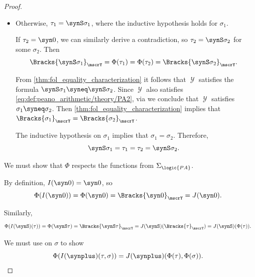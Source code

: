 \begin{proof}
\begin{itemize}
     implies that \( \mscrY \) satisfies \( \syn0 \syneq \synS \sigma_2 \), which contradicts the assumption that \( \mscrY \) satisfies \eqref{eq:def:peano_arithmetic/theory/PA1}.

    \item Otherwise, \( \tau_1 = \synS \sigma_1 \), where the inductive hypothesis holds for \( \sigma_1 \).

    If \( \tau_2 = \syn0 \), we can similarly derive a contradiction, so \( \tau_2 = \synS \sigma_2 \) for some \( \sigma_2 \). Then
    \begin{equation*}
      \Bracks{\synS \sigma_1}_\mscrY = \Phi(\tau_1) = \Phi(\tau_2) = \Bracks{\synS \sigma_2}_\mscrY.
    \end{equation*}

    From \cref{thm:fol_equality_characterization} it follows that \( \mscrY \) satisfies the formula \( \synS \sigma_1 \syneq \synS \sigma_2 \). Since \( \mscrY \) also satisfies \eqref{eq:def:peano_arithmetic/theory/PA2}, via  we conclude that \( \mscrY \) satisfies \( \sigma_1 \syneq \sigma_2 \). Then \cref{thm:fol_equality_characterization} implies that \( \Bracks{\sigma_1}_\mscrY = \Bracks{\sigma_2}_\mscrY \).

    The inductive hypothesis on \( \sigma_1 \) implies that \( \sigma_1 = \sigma_2 \). Therefore,
    \begin{equation*}
      \synS \sigma_1 = \tau_1 = \tau_2 = \synS \sigma_2.
    \end{equation*}
  \end{itemize}

   We must show that \( \Phi \) respects the functions from \( \Sigma_{\logic{PA}} \).

   By definition, \( I(\syn0) = \syn0 \), so
  \begin{equation*}
    \Phi(I(\syn0)) = \Phi(\syn0) = \Bracks{\syn0}_\mscrY = J(\syn0).
  \end{equation*}

   Similarly,
  \begin{equation*}
    \Phi(I(\synS)(\tau)) = \Phi(\synS \tau) = \Bracks{\synS \tau}_\mscrY = J(\synS)(\Bracks{\tau}_\mscrY) = J(\synS)(\Phi(\tau)).
  \end{equation*}

   We must use  on \( \sigma \) to show
  \begin{equation*}
    \Phi(I(\synplus)(\tau, \sigma)) = J(\synplus)(\Phi(\tau), \Phi(\sigma)).
  \end{equation*}


\end{proof}

